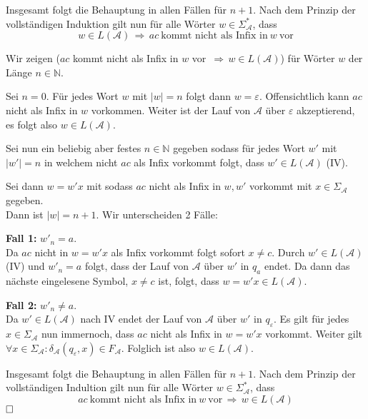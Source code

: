 \documentclass[a4paper,graphics,11pt]{article}
\begin{document}
Insgesamt folgt die Behauptung in allen Fällen für $n+1$. Nach dem Prinzip der vollständigen Induktion
gilt nun für alle Wörter $w \in \Sigma_\mathcal{A}^*$, dass
$$
    w \in L(\mathcal{A}) \,\Longrightarrow\, ac\ \text{kommt nicht als Infix in}\ w\ \text{vor}
$$

Wir zeigen ($ac$ kommt nicht als Infix in $w$ vor $\,\Longrightarrow\, w \in L(\mathcal{A})$) für Wörter $w$ der
Länge $n \in \mathbb{N}$.

Sei $n = 0$. Für jedes Wort $w$ mit $|w| = n$ folgt dann $w = \varepsilon$. Offensichtlich kann $ac$ nicht als
Infix in $w$ vorkommen. Weiter ist der Lauf von $\mathcal{A}$ über $\varepsilon$ akzeptierend, es folgt also
$w \in L(\mathcal{A})$.

Sei nun ein beliebig aber festes $n \in \mathbb{N}$ gegeben sodass für jedes Wort $w'$ mit $|w'| = n$ in welchem
nicht $ac$ als Infix vorkommt folgt, dass $w' \in L(\mathcal{A})$ (IV).

Sei dann $w = w'x$ mit sodass $ac$ nicht als Infix in $w, w'$ vorkommt mit $x \in \Sigma_\mathcal{A}$ gegeben.\\
Dann ist $|w| = n+1$. Wir unterscheiden 2 Fälle:

\textbf{Fall 1:} $w'_n = a$.\\
Da $ac$ nicht in $w = w'x$ als Infix vorkommt folgt sofort $x \neq c$. Durch $w' \in L(\mathcal{A})$ (IV) und
$w'_n = a$ folgt, dass der Lauf von $\mathcal{A}$ über $w'$ in $q_a$ endet. Da dann das nächste eingelesene Symbol,
$x \neq c$ ist, folgt, dass $w = w'x \in L(\mathcal{A})$.

\textbf{Fall 2:} $w'_n \neq a$.\\
Da $w' \in L(\mathcal{A})$ nach IV endet der Lauf von $\mathcal{A}$ über $w'$ in $q_\varepsilon$. Es gilt
für jedes $x \in \Sigma_\mathcal{A}$ nun immernoch, dass $ac$ nicht als Infix in $w = w'x$ vorkommt. Weiter gilt
$\forall x \in \Sigma_\mathcal{A} : \delta_\mathcal{A}(q_\varepsilon, x) \in F_\mathcal{A}$.
Folglich ist also $w \in L(\mathcal{A})$.

Insgesamt folgt die Behauptung in allen Fällen für $n+1$. Nach dem Prinzip der vollständigen Indultion gilt
nun für alle Wörter $w \in \Sigma_\mathcal{A}^*$, dass
$$
    ac\ \text{kommt nicht als Infix in}\ w\ \text{vor} \,\Longrightarrow\, w \in L(\mathcal{A})
$$
$\hfill\square$
\end{document}
